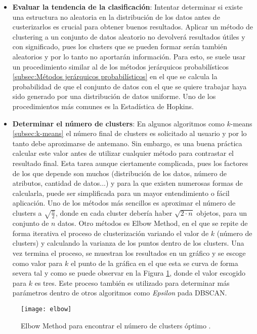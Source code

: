 \documentclass[10pt, a4paper]{article}
\begin{document}
\begin{itemize}
  \item \textbf{Evaluar la tendencia de la clasificación}: Intentar determinar si existe una estructura no aleatoria en la distribución de los datos antes de custerizarlos es crucial para obtener buenos resultados. Aplicar un método de clustering a un conjunto de datos aleatorio no devolverá resultados útiles y con significado, pues los clusters que se pueden formar serán también aleatorios y por lo tanto no aportarán información. Para esto, se suele usar un procedimiento similar al de los métodos jerárquicos probabilísticos \ref{subsec:Métodos jerárquicos probabilísticos} en el que se calcula la probabilidad de que el conjunto de datos con el que se quiere trabajar haya sido generado por una distribución de datos uniforme. Uno de los procedimientos más comunes es la Estadística de Hopkins. 
  
  \item \textbf{Determinar el número de clusters}: En algunos algoritmos como $k$-means \ref{subsec:k-means} el número final de clusters es solicitado al usuario y por lo tanto debe aproximarse de antemano. Sin embargo, es una buena práctica calcular este valor antes de utilizar cualquier método para contrastar el resultado final. Esta tarea aunque ciertamente complicada, pues los factores de los que depende son muchos (distribución de los datos, número de atributos, cantidad de datos...) y para la que existen numerosas formas de calcularla, puede ser simplificada para un mayor entendimiento o fácil aplicación.  Uno de los métodos más sencillos es aproximar el número de clusters a $\sqrt{\frac{n}{2}}$, donde en cada cluster debería haber $\sqrt{2 \cdotp n}$ objetos, para un conjunto de $n$ datos. Otro métodos es Elbow Method, en el que se repite de forma iterativa el proceso de clusterización variando el valor de $k$ (número de clusters) y calculando la varianza de los puntos dentro de los clusters. Una vez termina el proceso, se muestran los resultados en un gráfico y se escoge como valor para $k$ el punto de la gráfica en el que esta se curva de forma severa tal y como se puede observar en la Figura \ref{fig:elbow}, donde el valor escogido para $k$ es tres. Este proceso también es utilizado para determinar más parámetros dentro de otros algoritmos como \textit{Epsilon} pada DBSCAN. 
  
\end{itemize}

  
\begin{figure}[ht]
\centering
\texttt{[image: elbow]}
\caption{Elbow Method para encontrar el número de clusters óptimo \cite{elbow}.}
\label{fig:elbow}
\end{figure}
\end{document}
